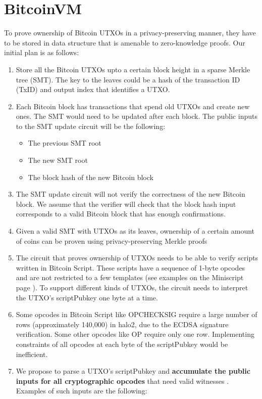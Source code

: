 \documentclass[10pt]{article}
\begin{document}
\section{BitcoinVM}%
\label{sec:bitcoinvm}
To prove ownership of Bitcoin UTXOs in a privacy-preserving manner, they have to be stored in data structure that is amenable to zero-knowledge proofs. Our initial plan is as follows:
\begin{enumerate}
  \item Store all the Bitcoin UTXOs upto a certain block height in a sparse Merkle tree (SMT). The key to the leaves could be a hash of the transaction ID (TxID) and output index that identifies a UTXO.
  \item Each Bitcoin block has transactions that spend old UTXOs and create new ones. The SMT would need to be updated after each block. The public inputs to the SMT update circuit will be the following:
    \begin{itemize}
      \item The previous SMT root
      \item The new SMT root
      \item The block hash of the new Bitcoin block
    \end{itemize}
  \item The SMT update circuit will not verify the correctness of the new Bitcoin block. We assume that the verifier will check that the block hash input corresponds to a valid Bitcoin block that has enough confirmations.
  \item Given a valid SMT with UTXOs as its leaves, ownership of a certain amount of coins can be proven using privacy-preserving Merkle proofs
  \item The circuit that proves ownership of UTXOs needs to be able to verify scripts written in Bitcoin Script. These scripts have a sequence of 1-byte opcodes and are not restricted to a few templates (see examples on the Miniscript page \cite{Miniscript}). To support different kinds of UTXOs, the circuit needs to interpret the UTXO's scriptPubkey one byte at a time.
  \item  Some opcodes in Bitcoin Script like OP\textunderscore CHECKSIG require a large number of rows (approximately 140,000) in halo2, due to the ECDSA signature verification. Some other opcodes like OP require only one row. Implementing constraints of all opcodes at each byte of the scriptPubkey would be inefficient.
  \item We propose to parse a UTXO's scriptPubkey and \textbf{accumulate the public inputs for all cryptographic opcodes} that need valid witnesses \cite{BitcoinCryptoOpcodes}. Examples of such inputs are the following:

\end{enumerate}
\end{document}
